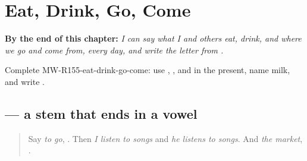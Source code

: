 
\chapter{Eat, Drink, Go, Come}
\label{ch:mw-a2-eat-drink-go-come}

\begin{chapteropening}
\textbf{By the end of this chapter:} \emph{I can say what I and others eat, drink, and where we go and come from, every day, and write the letter  from .}

Complete MW-R155-eat-drink-go-come: use , ,  and  in the present, name milk, and write .
\end{chapteropening}

\section[\texorpdfstring{\mw{जाऊं} · \mw{जावै} (jāū̃ · jāvai)}{जाऊं · जावै (jāū̃ · jāvai)}]{   — a stem that ends in a vowel}

\label{lesson:MW-C155-jau-javai}



\begin{quote}
Say \emph{to go}, \textbf{}. Then \emph{I listen to songs} and \emph{he listens to songs}. And \emph{the market}, \textbf{}.
\end{quote}

